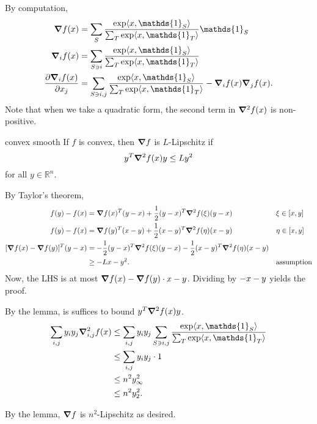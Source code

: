 \documentclass[10pt]{article}
\DeclarePairedDelimiter{\iprod}{\langle}{\rangle}
\let\norm\relax
\DeclarePairedDelimiter{\norm}{\lVert}{\rVert}
\newcommand{\ones}{\mathds{1}}
\newcommand{\R}{\mathbb{R}}
\begin{document}
\section{}
By computation,
\begin{align*}
  \grad f(x)
  &= \sum_S \frac{\exp\iprod{x, \ones_S}}{\sum_T \exp\iprod{x, \ones_T}} \ones_S \\
  \grad_i f(x)
  &= \sum_{S\ni i} \frac{\exp\iprod{x, \ones_S}}{\sum_T \exp\iprod{x, \ones_T}} \\
  \frac{\partial \grad_i f(x)}{\partial x_j}
  &= \sum_{S\ni i, j} \frac{\exp\iprod{x, \ones_S}}{\sum_T \exp\iprod{x, \ones_T}} - \grad_i f(x)\grad_j f(x).
\end{align*}
Note that when we take a quadratic form,
the second term in $\grad^2 f(x)$ is non-positive.

\begin{lem}{}{convex smooth}
  If $f$ is convex,
  then $\grad f$ is $L$-Lipschitz
  if
  \[
    y^T\grad^2 f(x)y \leq L\norm{y}^2
  \]
  for all $y\in \R^n$.
\end{lem}

\begin{pf}{}{}
  By Taylor's theorem,
  \begin{align*}
    f(y) - f(x) &= \grad f(x)^T(y-x) + \frac12 (y-x)^T \grad^2 f(\xi)(y-x) &&\xi\in [x, y] \\
    f(y) - f(x) &= \grad f(y)^T(x-y) + \frac12 (x-y)^T \grad^2 f(\eta)(x-y) &&\eta\in [x, y] \\
    [\grad f(x) - \grad f(y)]^T(y-x)
    &= -\frac12 (y-x)^T \grad^2 f(\xi)(y-x) - \frac12 (x-y)^T \grad^2 f(\eta) (x-y) \\
    &\geq -L \norm{x-y}^2. &&\text{assumption}
  \end{align*}
  Now, the LHS is at most $\norm{\grad f(x) - \grad f(y)}\cdot \norm{x-y}$.
  Dividing by $-\norm{x-y}$ yields the proof.
\end{pf}

By the lemma,
is suffices to bound $y^T \grad^2 f(x) y$.
\begin{align*}
  \sum_{i, j} y_iy_j \grad_{i, j}^2 f(x)
  &\leq \sum_{i, j} y_i y_j \sum_{S\ni i, j} \frac{\exp\iprod{x, \ones_S}}{\sum_T \exp\iprod{x, \ones_T}} \\
  &\leq \sum_{i, j} y_i y_j\cdot 1 \\
  &\leq n^2 \norm{y}_\infty^2 \\
  &\leq n^2 \norm{y}_2^2.
\end{align*}

By the lemma,
$\grad f$ is $n^2$-Lipschitz as desired.
\end{document}
